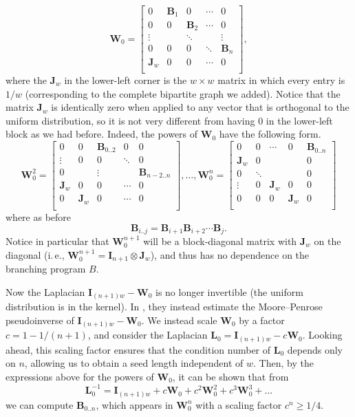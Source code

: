 \documentclass[11pt]{article}
\numberwithin{equation}{section}
\theoremstyle{definition}
\theoremstyle{plain}
\newcommand{\ie}{i.\,e.}
\newcommand{\mB}{\mathbf{B}}
\newcommand{\mW}{\mathbf{W}}
\newcommand{\mL}{\mathbf{L}}
\newcommand{\I}{\mathbf{I}}
\newcommand{\Jw}{\mathbf{J}_w}
\begin{document}
    \begin{equation}
        \mW_0 =
    \begin{bmatrix}
    0 & \mB_1 & 0 & \cdots & 0 \\
    0 & 0 & \mB_2 & \cdots & 0 \\
    \vdots & & \ddots & & \vdots\\
    0 & 0 & 0 & \ddots & \mB_n\\
    \Jw & 0 & 0 & \cdots &  0 \\
    \end{bmatrix}, \label{eqn:bWhat}
    \end{equation}
    where the $\Jw$ in the lower-left corner is the $w\times w$ matrix in which every entry is $1/w$ (corresponding to the complete bipartite graph we added).  Notice that the matrix $\Jw$ is identically zero when applied to any vector that is orthogonal to the uniform distribution, so it is not very different %
    from having $0$ in the lower-left block as we had before. Indeed, the powers of $\mW_0$ have the following form. %
    \begin{equation} \label{eqn:bWhatpowers} 
    \mW_0^2 =
    \begin{bmatrix}
    0 & 0 & \mB_{0..2} & 0 & 0 \\
    \vdots & 0 & 0 & \ddots & 0 \\
    0 & & \vdots & & \mB_{n-2..n}\\
    \Jw & 0 & 0 & \cdots & 0\\
    0& \Jw & 0 & \cdots &  0 \\
    \end{bmatrix}, \ldots,
    \mW_0^n =
    \begin{bmatrix}
    0 & 0 & \cdots & 0 & \mB_{0..n} \\
    \Jw & 0 &  &  & 0 \\
    0 & \ddots &  & & 0\\
    \vdots & 0 & \Jw & 0 & 0\\
    0& 0 & 0 & \Jw &  0 \\
    \end{bmatrix}
    \end{equation}
    where as before 
    $$\mB_{i..j} = \mB_{i+1}\mB_{i+2}\cdots \mB_j.$$
    Notice in particular that $\mW_0^{n+1}$ will be a block-diagonal
    matrix with %
    $\Jw$ %
on the diagonal (\ie, $\mW_0^{n+1}=\I_{n+1}\otimes \Jw$), and thus has no dependence on the branching program $B$.
    
    Now the Laplacian $\I_{(n+1)w}-\mW_0$ is no longer invertible (the uniform distribution is in the kernel).  In \cite{AhmadinejadKeMuPeSiVa19}, they instead estimate the Moore--Penrose pseudoinverse of $\I_{(n+1)w}-\mW_0$. We instead scale $\mW_0$ by a factor $c=1-1/(n+1)$, and consider the Laplacian $\mL_0=\I_{(n+1)w}-c\mW_0$. Looking ahead, this scaling factor ensures that the condition number of $\mL_0$ depends only on $n$, allowing us to obtain a seed length independent of $w$. Then, by the expressions above for the powers of $\mW_0$, it can be shown that from
    $$\mL^{-1}_0 = \I_{(n+1)w}+c\mW_0+c^2\mW_0^2+c^3\mW_0^3+\dots$$
    we can compute $\mB_{0..n}$, which appears in $\mW_0^n$ with a scaling factor $c^n\geq 1/4$.
   
\end{document}

